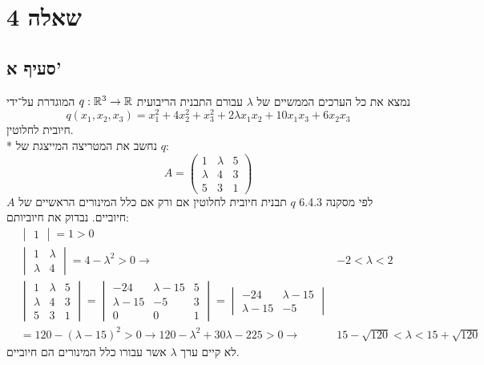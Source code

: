 \section{שאלה 4}
\subsection{סעיף א'}
נמצא את כל הערכים הממשיים של $\lambda$ עבורם התבנית הריבועית $q : \mathbb{R}^3 \to \mathbb{R}$ המוגדרת על־ידי
\[
	q(x_1, x_2, x_3) = x_1^2 + 4x_2^2 + x_3^2 + 2\lambda x_1 x_2 + 10x_1x_3 + 6x_2x_3
\]
חיובית לחלוטין. \\*
נחשב את המטריצה המייצגת של $q$:
\[
	A = \begin{pmatrix}
		1 & \lambda & 5 \\
		\lambda & 4 & 3 \\
		5 & 3 & 1
	\end{pmatrix}
\]
לפי מסקנה 6.4.3 $q$ תבנית חיובית לחלוטין אם ורק אם כלל המינורים הראשיים של $A$ חיוביים. נבדוק את חיוביותם:
\begin{align*}
	& \begin{vmatrix}
		1
	\end{vmatrix} = 1 > 0 \\
	& \begin{vmatrix}
		1 & \lambda \\
		\lambda & 4
	\end{vmatrix} = 4 - \lambda^2 > 0 \rightarrow
	& -2 < \lambda < 2 \\
	& \begin{vmatrix}
		1 & \lambda & 5 \\
		\lambda & 4 & 3 \\
		5 & 3 & 1
	\end{vmatrix}
	= \begin{vmatrix}
		-24 & \lambda - 15 & 5 \\
		\lambda - 15 & -5 & 3 \\
		0 & 0 & 1
	\end{vmatrix}
	= \begin{vmatrix}
		-24 & \lambda - 15 \\
		\lambda - 15 & -5
	\end{vmatrix} \\
	& = 120 - {(\lambda - 15)}^2 > 0
	\rightarrow 120 - \lambda^2 + 30 \lambda - 225 > 0
	\rightarrow & 15 - \sqrt{120} < \lambda < 15 + \sqrt{120}
\end{align*}
לא קיים ערך $\lambda$ אשר עבורו כלל המינורים הם חיוביים.

